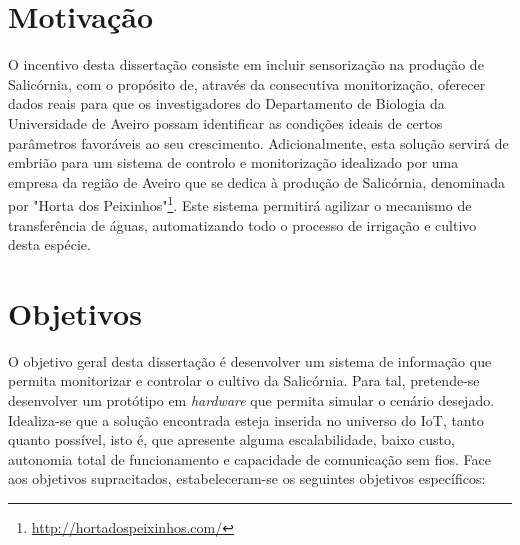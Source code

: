 \section{Motivação}

O incentivo desta dissertação consiste em incluir sensorização na produção de Salicórnia, com o propósito de, através da consecutiva monitorização, oferecer dados reais para que os investigadores do Departamento de Biologia da Universidade de Aveiro possam identificar as condições ideais de certos parâmetros favoráveis ao seu crescimento. Adicionalmente, esta solução servirá de embrião para um sistema de controlo e monitorização idealizado por uma empresa da região de Aveiro que se dedica à produção de Salicórnia, denominada por "Horta dos Peixinhos"\footnote{\url{http://hortadospeixinhos.com/}}. Este sistema permitirá agilizar o mecanismo de transferência de águas, automatizando todo o processo de irrigação e cultivo desta espécie. 









\section{Objetivos}
\label{objectivos}



O objetivo geral desta dissertação é desenvolver um sistema de informação que permita monitorizar e controlar o cultivo da Salicórnia. Para tal, pretende-se desenvolver um protótipo em \textit{hardware} que permita  simular o cenário desejado. Idealiza-se que a solução encontrada esteja inserida no universo do \ac{IoT}\cite{jnsalic}, tanto quanto possível, isto é, que apresente alguma escalabilidade, baixo custo, autonomia total de funcionamento e capacidade de comunicação sem fios. Face aos objetivos supracitados, estabeleceram-se os seguintes objetivos específicos:




